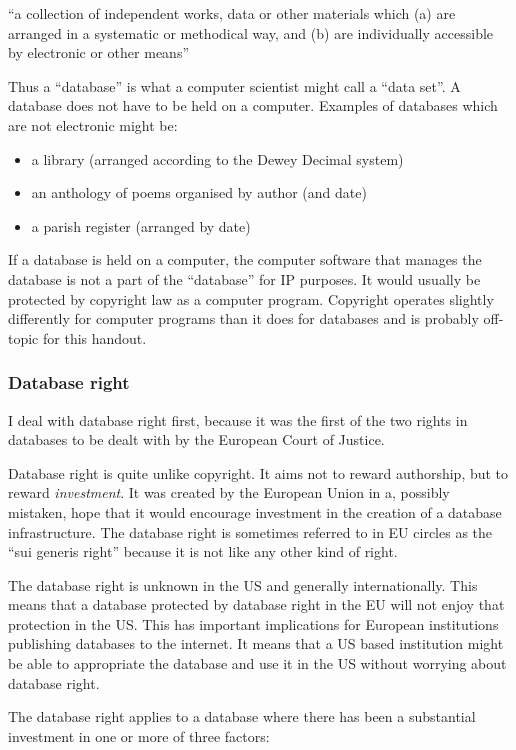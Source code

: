 ``a collection of independent works, data or other materials which (a)
are arranged in a systematic or methodical way, and (b) are individually
accessible by electronic or other means''

Thus a ``database'' is what a computer scientist might call a ``data
set''. A database does not have to be held on a computer. Examples of
databases which are not electronic might be:

\begin{itemize}
\item
  a library (arranged according to the Dewey Decimal system)
\item
  an anthology of poems organised by author (and date)
\item
  a parish register (arranged by date)
\end{itemize}

If a database is held on a computer, the computer software that manages
the database is not a part of the ``database'' for IP purposes. It would
usually be protected by copyright law as a computer program. Copyright
operates slightly differently for computer programs than it does for
databases and is probably off-topic for this handout.

\subsubsection{Database right}\label{database-right}

I deal with database right first, because it was the first of the two
rights in databases to be dealt with by the European Court of Justice.

Database right is quite unlike copyright. It aims not to reward
authorship, but to reward \emph{investment}. It was created by the
European Union in a, possibly mistaken, hope that it would encourage
investment in the creation of a database infrastructure. The database
right is sometimes referred to in EU circles as the ``sui generis
right'' because it is not like any other kind of right.

The database right is unknown in the US and generally
internationally. This means that a database protected by database right
in the EU will not enjoy that protection in the US. This has important
implications for European institutions publishing databases to the
internet. It means that a US based institution might be able to
appropriate the database and use it in the US without worrying about
database right.

The database right applies to a database where there has been a
substantial investment in one or more of three factors:

